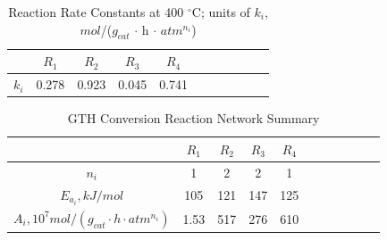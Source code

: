 \documentclass[journal=iecred,manuscript=article]{achemso}
\begin{document}
\begin{table}[h]
  \centering
  \caption{Reaction Rate Constants at 400 $^{\circ}$C; units of $k_i$, $mol$/($g_{cat}$ $\cdot$ h $\cdot$ $atm^{n_i}$)} \label{T_all_k}

  \begin{tabular}{c c c c c c c c c c c}
    \toprule
    & $R_1$      & $R_2$      & $R_3$      & $R_4$  \\
    \midrule
    $k_i$      & 0.278      & 0.923      & 0.045      & 0.741          \\
    \bottomrule
  \end{tabular}
\end{table}

\begin{table}[h]
  \centering
  \caption{GTH Conversion Reaction Network Summary} \label{T_Ea}
  \begin{tabular}{c c c c c c c c c c c}
    \toprule
    & $R_1$      & $R_2$      & $R_3$      & $R_4$  \\
    \midrule
    $n_i$      & 1          & 2          & 2          & 1        \\
    $E_{a_i}, kJ/mol$     & 105        & 121        & 147        & 125      \\
    $A_{i},10^7 mol/(g_{cat} \cdot h \cdot atm^{n_i})$     & 1.53        & 517        & 276        & 610      \\
    \bottomrule
  \end{tabular}
\end{table}
\end{document}
